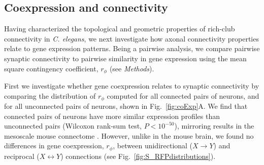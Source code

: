 \documentclass[10pt,letterpaper]{article}
\begin{document}
\subsection*{Coexpression and connectivity}

Having characterized the topological and geometric properties of rich-club connectivity in \emph{C. elegans}, we next investigate how axonal connectivity properties relate to gene expression patterns.
Being a pairwise analysis, we compare pairwise synaptic connectivity to pairwise similarity in gene expression using the mean square contingency coefficient, $r_\phi$ (see \emph{Methods}).

First we investigate whether gene coexpression relates to synaptic connectivity by comparing the distribution of $r_\phi$ computed for all connected pairs of neurons, and for all unconnected pairs of neurons, shown in Fig.~\ref{fig:coExp}A.
We find that connected pairs of neurons have more similar expression profiles than unconnected pairs (Wilcoxon rank-sum test, $P < 10^{-50}$), mirroring results in the mesoscale mouse connectome \cite{Fulcher:2016ck}.
However, unlike in the mouse brain, we found no differences in gene coexpression, $r_\phi$, between unidirectional ($X \rightarrow Y$) and reciprocal ($X \leftrightarrow Y$) connections (see Fig.~\ref{fig:S_RFPdistributions}).
\end{document}
